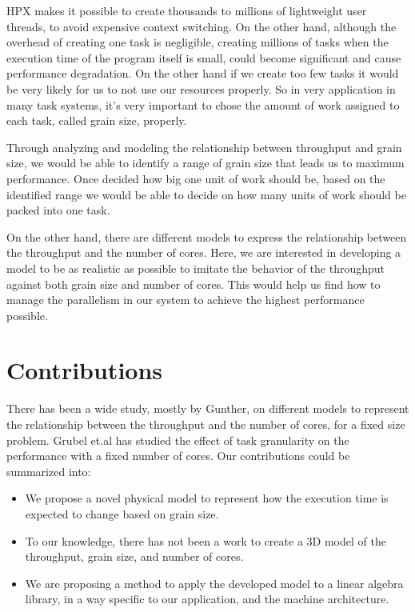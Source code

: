 HPX makes it possible to create thousands to millions of lightweight user threads, to avoid expensive context switching. On the other hand, although the overhead of creating one task is negligible, creating millions of tasks when the execution time of the program itself is small, could become significant and cause performance degradation. On the other hand if we create too few tasks it would be very likely for us to not use our resources properly. So in very application in many task systems, it's very important to chose the amount of work assigned to each task, called grain size, properly. 

Through analyzing and modeling the relationship between throughput and grain size, we would be able to identify a range of grain size that leads us to maximum performance. Once decided how big one unit of work should be, based on the identified range we would be able to decide on how many units of work should be packed into one task.

On the other hand, there are different models to express the relationship between the throughput and the number of cores. Here, we are interested in developing a model to be as realistic as possible to imitate the behavior of the throughput against both grain size and number of cores. This would help us find how to manage the parallelism in our system to achieve the highest performance possible.
 
\vspace{\baselineskip}
\section{Contributions}
There has been a wide study, mostly by Gunther\cite{gunther2000practical,gunther2002new,gunther2007guerrilla,gunther2011new}, on different models to represent the relationship between the throughput and the number of cores, for a fixed size problem. 
Grubel et.al\cite{grubel2015performance} has studied the effect of task granularity on the performance with a fixed number of cores. 
Our contributions could be summarized into:
\begin{itemize}
	\item{We propose a novel physical model to represent how the execution time is expected to change based on grain size.}
	\item{To our knowledge, there has not been a work to create a 3D model of the throughput, grain size, and number of cores.} 
	\item{We are proposing a method to apply the developed model to a linear algebra library, in a way specific to our application, and the machine architecture.}
\end{itemize}
 

